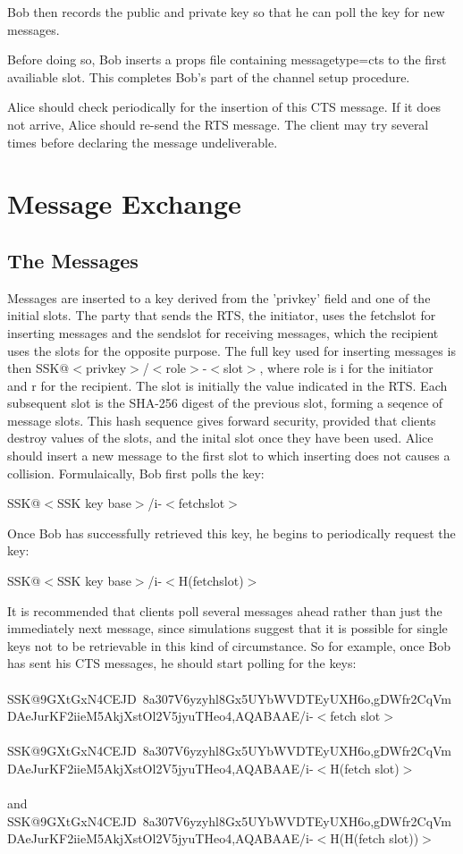 \documentclass[12pt,a4paper]{article}
\begin{document}
Bob then records the public and private key so that he can poll the key for new messages.

Before doing so, Bob inserts a props file containing messagetype=cts to the first availiable slot.
This completes Bob's part of the channel setup procedure.

Alice should check periodically for the insertion of this CTS message. If it does not arrive, Alice
should re-send the RTS message. The client may try several times before declaring the message
undeliverable.

\section{Message Exchange}
\subsection{The Messages}
Messages are inserted to a key derived from the 'privkey' field and one of the initial slots. The
party that sends the RTS, the initiator, uses the fetchslot for inserting messages and the sendslot
for receiving messages, which the recipient uses the slots for the opposite purpose. The full key
used for inserting messages is then SSK@$<$privkey$>$/$<$role$>$-$<$slot$>$, where role is i for the initiator
and r for the recipient. The slot is initially the value indicated in the RTS. Each subsequent
slot is the SHA-256 digest of the previous slot, forming a seqence of message slots. This hash
sequence gives forward security, provided that clients destroy values of the slots, and the inital
slot once they have been used. Alice should insert a new message to the first slot to which
inserting does not causes a collision. Formulaically, Bob first polls the key:

SSK@$<$SSK key base$>$/i-$<$fetchslot$>$

Once Bob has successfully retrieved this key, he begins to periodically request the key:

SSK@$<$SSK key base$>$/i-$<$H(fetchslot)$>$

It is recommended that clients poll several messages ahead rather than just the immediately next
message, since simulations suggest that it is possible for single keys not to be retrievable in this
kind of circumstance. So for example, once Bob has sent his CTS messages, he should start polling
for the keys: \\
\\
SSK@9GXtGxN4CEJD~8a\-307V6yzyhl8Gx5U\-YbWVDTEyUXH6o,gDWfr2CqVm\-
DAeJurKF2iieM\-5AkjXstOl2V5j\-yuTHeo4,AQABAAE/i-$<$fetch slot$>$ \\
\\
SSK@9GXtGxN4CEJD~8a\-307V6yzyhl8Gx5U\-YbWVDTEyUXH6o,gDWfr2CqVm\-
DAeJurKF2iieM\-5AkjXstOl2V5j\-yuTHeo4,AQABAAE/i-$<$H(fetch slot)$>$ \\
\\
and \\
SSK@9GXtGxN4CEJD~8a\-307V6yzyhl8Gx5U\-YbWVDTEyUXH6o,gDWfr2CqVm\-
DAeJurKF2iieM\-5AkjXstOl2V5j\-yuTHeo4,AQABAAE/i-$<$H(H(fetch slot))$>$
\end{document}
